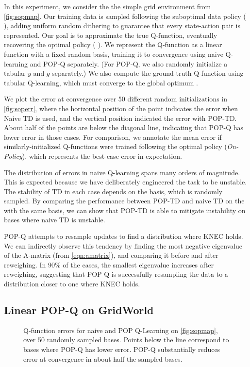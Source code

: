 In this experiment, we consider the the simple grid environment from \cref{fig:sopmap}.
Our training data is sampled following the suboptimal data policy ({\color{datapolicy} \datapolicyglyph}), adding uniform random dithering to guarantee that every state-action pair is represented.
Our goal is to approximate the true Q-function, eventually recovering the optimal policy ({\color{optimpolicy} \optimpolicyglyph}).
We represent the Q-function as a linear function with a fixed random basis, training it to convergence using naive Q-learning and POP-Q separately. (For POP-Q, we also randomly initialize a tabular $y$ and $g$ separately.) We also compute the ground-truth Q-function using tabular Q-learning, which must converge to the global optimum \cite{watkins1992q}.

We plot the error at convergence over 50 different random initializations in \cref{fig:soperr}, where the horizontal position of the point indicates the error when Naive TD is used, and the vertical position indicated the error with POP-TD. About half of the points are below the diagonal line, indicating that POP-Q has lower error in those cases. For comparison, we annotate the mean error if similarly-initialized Q-functions were trained following the optimal policy (\emph{On-Policy}), which represents the best-case error in expectation.

The distribution of errors in naive Q-learning spans many orders of magnitude. This is expected because we have deliberately engineered the task to be unstable. The stability of TD in each case depends on the basis, which is randomly sampled. By comparing the performance between POP-TD and naive TD on the with the same basis, we can show that POP-TD is able to mitigate instability on bases where naive TD is unstable.

POP-Q attempts to resample updates to find a distribution where KNEC holds. We can indirectly observe this tendency by finding the most negative eigenvalue of the A-matrix (from \cref{eqn:amatrix}), and comparing it before and after reweighing. In 90\% of the cases, the smallest eigenvalue increases after reweighing, suggesting that POP-Q is successfully resampling the data to a distribution closer to one where KNEC holds.


\subsection{Linear POP-Q on GridWorld}

\label{sec:explinearoffpolicy}
\begin{figure}[t]
  \centering
  
  \caption{Q-function errors for naive and POP Q-Learning on \cref{fig:sopmap}, over 50 randomly sampled bases. Points below the line correspond to bases where POP-Q has lower error. POP-Q substantially reduces error at convergence in about half the sampled bases. }
  \label{fig:linearerr}
\end{figure}

